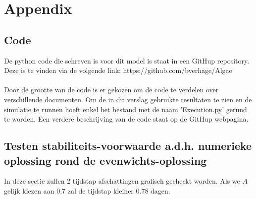 \section*{Appendix}

\subsection*{Code}
De python code die schreven is voor dit model is staat in een GitHup repository.\\
Deze is te vinden via de volgende link: 
https://github.com/bverhage/Algae\\
\\
Door de grootte van de code is er gekozen om de code te verdelen over verschillende documenten. Om de in dit verslag gebruikte resultaten te zien en de simulatie te runnen hoeft enkel het bestand met de naam 'Execution.py' gerund te worden. Een verdere beschrijving van de code staat op de GitHup webpagina.
\cite{artikel1}
\newpage
\subsection*{Testen stabiliteits-voorwaarde a.d.h. numerieke oplossing rond de evenwichts-oplossing}
In deze sectie zullen 2 tijdstap afschattingen grafisch gecheckt worden. Als we $A$ gelijk kiezen aan 0.7 zal de tijdstap kleiner 0.78 dagen.

